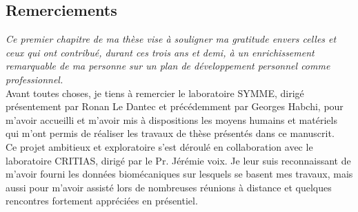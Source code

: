 
{}

\vspace*{-1.6cm}
\begin{flushright}
\section*{\fontsize{20pt}{20pt}\lettrine[lines=1]{Remerciements}{}}
\end{flushright}
\vspace{0.5cm}


\chead[\fancyplain{}{}]
      {\fancyplain{}{}}
\lfoot[\fancyplain{}{}]
      {\fancyplain{}{}}
\cfoot[\fancyplain{}{\thepage}]
      {\fancyplain{}{\thepage}}
\rfoot[\fancyplain{}{}]%
     {\fancyplain{}{\scriptsize}}


\emph{Ce premier chapitre de ma thèse vise à souligner ma gratitude envers celles et ceux qui ont contribué, durant ces trois ans et demi, à un enrichissement remarquable de ma personne sur un plan de développement personnel comme professionnel.}\\

Avant toutes choses, je tiens à remercier le laboratoire SYMME, dirigé présentement par Ronan Le Dantec et précédemment par Georges Habchi, pour m'avoir accueilli et m'avoir mis à dispositions les moyens humains et matériels qui m'ont permis de réaliser les travaux de thèse présentés dans ce manuscrit. \\

Ce projet ambitieux et exploratoire s'est déroulé en collaboration avec le laboratoire CRITIAS, dirigé par le Pr. Jérémie voix. Je leur suis reconnaissant de m'avoir fourni les données biomécaniques sur lesquels se basent mes travaux, mais aussi pour m'avoir assisté lors de nombreuses réunions à distance et quelques rencontres fortement appréciées en présentiel. \\

